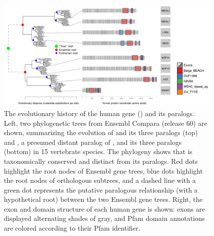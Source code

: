 \begin{figure}
\centering
\includegraphics[scale=0.35]{Figs/nbeal2_full.pdf}
\caption{The evolutionary history of the human 
  gene () and its paralogs. Left, two phylogenetic trees from
  Ensembl Compara (release 60) are shown, summarizing the evolution of
   and its three paralogs (top) and , a presumed distant
  paralog of , and its three paralogs (bottom) in 15
  vertebrate species. The phylogeny shows that  is
  taxonomically conserved and distinct from its paralogs. Red dots
  highlight the root nodes of Ensembl gene trees, blue dots highlight
  the root nodes of \euth orthologous subtrees, and a dashed line
  with a green dot represents the putative paralogous relationship
  (with a hypothetical root) between the two Ensembl gene
  trees. Right, the exon and domain structure of each human gene is
  shown: exons are displayed alternating shades of gray, and Pfam
  domain annotations are colored according to their Pfam identifier.}
\label{nbeal2}
\end{figure}

